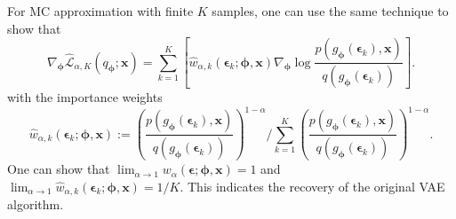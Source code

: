 For MC approximation with finite $K$ samples, one can use the same technique to show that
\begin{equation*}
\nabla_{\bm{\phi}} \hat{\mathcal{L}}_{\alpha, K}(q_{\bm{\phi}}; \bm{x}) 
= \sum_{k=1}^K \left[ \hat{w}_{\alpha, k}(\bm{\epsilon}_k; \bm{\phi}, \bm{x}) \nabla_{\bm{\phi}} \log \frac{p(g_{\bm{\phi}}(\bm{\epsilon}_k), \bm{x})}{q(g_{\bm{\phi}}(\bm{\epsilon}_k))} \right].
\end{equation*}
with the importance weights
\begin{equation}
\hat{w}_{\alpha, k}(\bm{\epsilon}_k; \bm{\phi}, \bm{x}) := \left( \frac{p(g_{\bm{\phi}}(\bm{\epsilon}_k), \bm{x})}{q(g_{\bm{\phi}}(\bm{\epsilon}_k))} \right)^{1 - \alpha} \bigg/ \sum_{k=1}^K \left( \frac{p(g_{\bm{\phi}}(\bm{\epsilon}_k), \bm{x})}{q(g_{\bm{\phi}}(\bm{\epsilon}_k))} \right)^{1 - \alpha}.
\end{equation}
One can show that $\lim_{\alpha \rightarrow 1} w_{\alpha}(\bm{\epsilon}; \bm{\phi}, \bm{x}) = 1$ and $\lim_{\alpha \rightarrow 1} \hat{w}_{\alpha, k}(\bm{\epsilon}_k; \bm{\phi}, \bm{x}) = 1 / K$. This indicates the recovery of the original VAE algorithm.